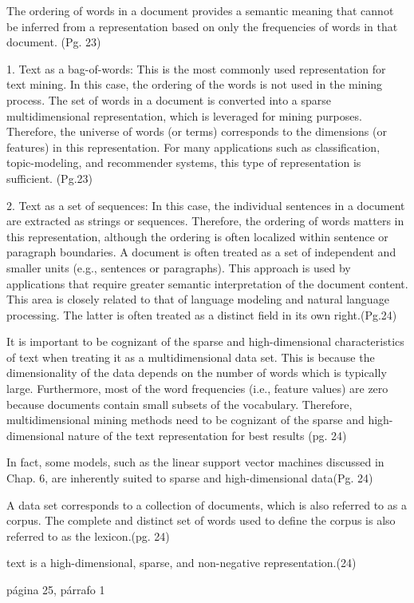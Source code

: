 The ordering of words in a document provides a semantic meaning that cannot be
inferred from a representation based on only the frequencies of words in that document.
(Pg. 23)

1. Text as a bag-of-words: This is the most commonly used representation for text mining.
In this case, the ordering of the words is not used in the mining process. The set
of words in a document is converted into a sparse multidimensional representation,
which is leveraged for mining purposes. Therefore, the universe of words (or terms)
corresponds to the dimensions (or features) in this representation. For many applications
such as classification, topic-modeling, and recommender systems, this type of
representation is sufficient. (Pg.23)

2. Text as a set of sequences: In this case, the individual sentences in a document are
extracted as strings or sequences. Therefore, the ordering of words matters in this
representation, although the ordering is often localized within sentence or paragraph
boundaries. A document is often treated as a set of independent and smaller units (e.g.,
sentences or paragraphs). This approach is used by applications that require greater
semantic interpretation of the document content. This area is closely related to that
of language modeling and natural language processing. The latter is often treated as a
distinct field in its own right.(Pg.24)


It is important to be cognizant of the sparse and high-dimensional characteristics of text
when treating it as a multidimensional data set. This is because the dimensionality of the
data depends on the number of words which is typically large. Furthermore, most of the word
frequencies (i.e., feature values) are zero because documents contain small subsets of the
vocabulary. Therefore, multidimensional mining methods need to be cognizant of the sparse
and high-dimensional nature of the text representation for best results (pg. 24)


In fact, some models, such as the linear support vector machines
discussed in Chap. 6, are inherently suited to sparse and high-dimensional data(Pg. 24)

A data set corresponds to a collection of documents, which is also referred to as
a corpus. The complete and distinct set of words used to define the corpus is also referred
to as the lexicon.(pg. 24)


text is a high-dimensional, sparse, and non-negative representation.(24)


página 25, párrafo 1